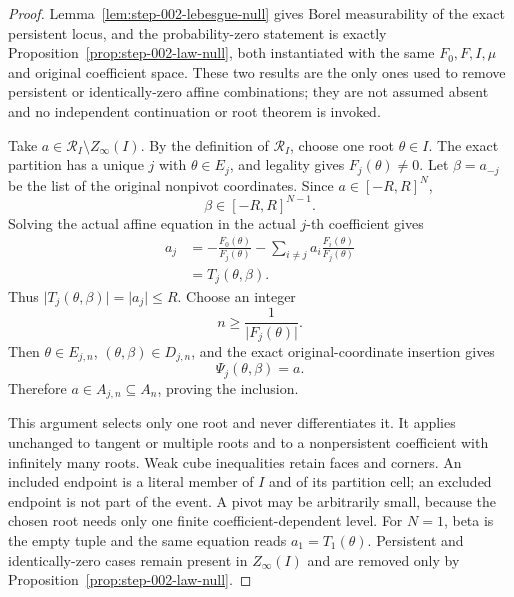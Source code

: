 \begin{proof}
Lemma~\ref{lem:step-002-lebesgue-null} gives Borel measurability of the exact
persistent locus, and the probability-zero statement is exactly
Proposition~\ref{prop:step-002-law-null}, both instantiated with the same \(F_0,F,I,\mu\) and original
coefficient space. These two results are the only ones used to remove persistent or
identically-zero affine combinations; they are not assumed absent and no independent continuation or root
theorem is invoked.

Take \(a\in\mathcal R_I\setminus Z_\infty(I)\). By the definition of \(\mathcal R_I\), choose one root
\(\theta\in I\). The exact partition has a unique \(j\) with \(\theta\in E_j\), and legality gives
\(F_j(\theta)\neq0\). Let \(\beta=a_{-j}\) be the list of the original nonpivot coordinates. Since
\(a\in[-R,R]^N\),
\begin{equation}
\label{eq:appendix-display-093}
\beta\in[-R,R]^{N-1}.
\end{equation}
Solving the actual affine equation in the actual \(j\)-th coefficient gives
\begin{equation}
\label{eq:appendix-display-094}
\begin{aligned}
a_j
&=-\frac{F_0(\theta)}{F_j(\theta)}
-\sum_{i\neq j}a_i\frac{F_i(\theta)}{F_j(\theta)}\\
&=T_j(\theta,\beta).
\end{aligned}
\end{equation}
Thus \(\lvert T_j(\theta,\beta)\rvert=\lvert a_j\rvert\leq R\). Choose an integer
\begin{equation}
\label{eq:appendix-display-095}
n\geq\frac1{\lvert F_j(\theta)\rvert}.
\end{equation}
Then \(\theta\in E_{j,n}\), \((\theta,\beta)\in D_{j,n}\), and the exact original-coordinate insertion gives
\begin{equation}
\label{eq:appendix-display-096}
\Psi_j(\theta,\beta)=a.
\end{equation}
Therefore \(a\in A_{j,n}\subseteq A_n\), proving the inclusion.

This argument selects only one root and never differentiates it. It applies unchanged to tangent or multiple
roots and to a nonpersistent coefficient with infinitely many roots. Weak cube inequalities retain faces and
corners. An included endpoint is a literal member of \(I\) and of its partition cell; an excluded endpoint is
not part of the event. A pivot may be arbitrarily small, because the chosen root needs only one finite
coefficient-dependent level. For \(N=1\), beta is the empty tuple and the same equation reads
\(a_1=T_1(\theta)\). Persistent and identically-zero cases remain present in
\(Z_\infty(I)\) and are removed only by
Proposition~\ref{prop:step-002-law-null}. 
\end{proof}

